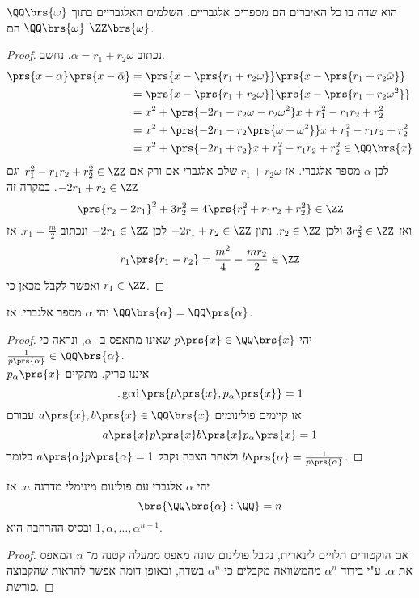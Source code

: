 \documentclass[a4paper,10pt,twoside,openany]{book}
\begin{document}
\begin{proposition}
$\QQ\brs{\omega}$
הוא שדה בו כל האיברים הם מספרים אלגבריים.
השלמים האלגבריים בתוך
$\QQ\brs{\omega}$
הם
$\ZZ\brs{\omega}$.
\end{proposition}
\begin{proof}
נכתוב
$\alpha = r_1 + r_2 \omega$.
נחשב.
\begin{align*}
\prs{x-\alpha}\prs{x-\bar{\alpha}} &=
\prs{x-\prs{r_1 + r_2 \omega}} \prs{x-\prs{r_1 + r_2\bar{\omega}}} \\&=
\prs{x - \prs{r_1 + r_2 \omega}} \prs{x-\prs{r_1 + r_2 \omega^2}} \\&=
x^2 + \prs{-2r_1 - r_2 \omega - r_2 \omega^2} x + r_1^2 - r_1 r_2 + r_2^2 \\&=
x^2 + \prs{-2r_1 - r_2\prs{\omega + \omega^2}} x + r_1^2 - r_1 r_2 + r_2^2 \\
&= x^2 + \prs{-2r_1 + r_2} x + r_1^2 - r_1 r_2 + r_2^2 \in \QQ\brs{x}
\end{align*}
לכן
$\alpha$
מספר אלגברי.
אז
$r_1 + r_2\omega$
שלם אלגברי אם ורק אם
$r_1^2 - r_1 r_2 + r_2^2 \in \ZZ$
וגם
$-2r_1 + r_2 \in \ZZ$.
במקרה זה
\[\prs{r_2 - 2 r_1}^2 + 3r_2^2 = 4\prs{r_1^2 + r_1r_2 + r_2^2} \in \ZZ\]
ואז
$3r_2^2 \in \ZZ$
ולכן
$r_2 \in \ZZ$.
נתון
$-2r_1 + r_2 \in \ZZ$
לכן
$-2r_1 \in \ZZ$
ונכתוב
$r_1 = \frac{m}{2}$.
אז
\[r_1 \prs{r_1 - r_2} = \frac{m^2}{4} - \frac{m r_2}{2} \in \ZZ\]
ואפשר לקבל מכאן כי
$r_1 \in \ZZ$.
\end{proof}
\begin{proposition}
יהי
$\alpha$
מספר אלגברי.
אז
$\QQ\brs{\alpha} = \QQ\prs{\alpha}$.
\end{proposition}
\begin{proof}
יהי
$p\prs{x} \in \QQ\brs{x}$
שאינו מתאפס ב־%
$\alpha$,
ונראה כי
$\frac{1}{p\prs{\alpha}} \in \QQ\brs{\alpha}$.\\
$p_{\alpha}\prs{x}$
איננו פריק.
מתקיים
\[\text{.} \gcd\prs{p\prs{x}, p_{\alpha}\prs{x}} = 1\]
אז קיימים פולינומים
$a\prs{x},b\prs{x} \in \QQ\brs{x}$
עבורם
\[a\prs{x} p\prs{x}  b\prs{x} p_{\alpha}\prs{x} = 1\]
ולאחר הצבה נקבל
$a\prs{\alpha} p\prs{\alpha} = 1$
כלומר
$b\prs{\alpha} = \frac{1}{p\prs{\alpha}}$.
\end{proof}

\begin{proposition}
יהי
$\alpha$
אלגברי עם פולינום מינימלי מדרגה
$n$.
אז
\[\brs{\QQ\brs{\alpha} : \QQ} = n\]
ובסיס ההרחבה הוא
$1,\alpha,\ldots, \alpha^{n-1}$.
\end{proposition}

\begin{proof}
אם הוקטורים תלויים לינארית, נקבל פולינום שונה מאפס ממעלה קטנה מ־%
$n$
המאפס את
$\alpha$.
ע"י בידוד
$\alpha^n$
מהמשוואה מקבלים כי
$\alpha^n$
בשדה, ובאופן דומה אפשר להראות שהקבוצה פורשת.
\end{proof}

\backmatter
\end{document}
